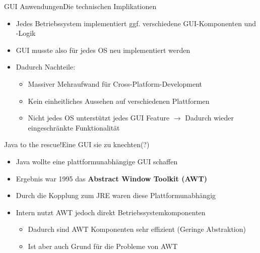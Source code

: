 \begin{frame}{GUI Anwendungen}{Die technischen Implikationen}
	\begin{itemize}
		\item Jedes Betriebssystem implementiert ggf. verschiedene GUI-Komponenten und -Logik
		\item GUI musste also für jedes OS neu implementiert werden
		\item Dadurch Nachteile:
		\begin{itemize}
			\item Massiver Mehraufwand für Cross-Platform-Development
			\item Kein einheitliches Aussehen auf verschiedenen Plattformen
			\item Nicht jedes OS unterstützt jedes GUI Feature $\rightarrow$ Dadurch wieder eingeschränkte Funktionalität
		\end{itemize}
	\end{itemize}
\end{frame}

\begin{frame}{Java to the rescue!}{Eine GUI sie zu knechten(?)}
	\begin{itemize}
		\item Java wollte eine plattformunabhängige GUI schaffen
		\item Ergebnis war 1995 das \textbf{Abstract Window Toolkit (AWT)}
		\item Durch die Kopplung zum JRE waren diese Plattformunabhängig
		\item Intern nutzt AWT jedoch direkt Betriebssystemkomponenten
		\begin{itemize}
			\item Dadurch sind AWT Komponenten sehr effizient (Geringe Abstraktion)
			\item Ist aber auch Grund für die Probleme von AWT
		\end{itemize}
	\end{itemize}
\end{frame}

